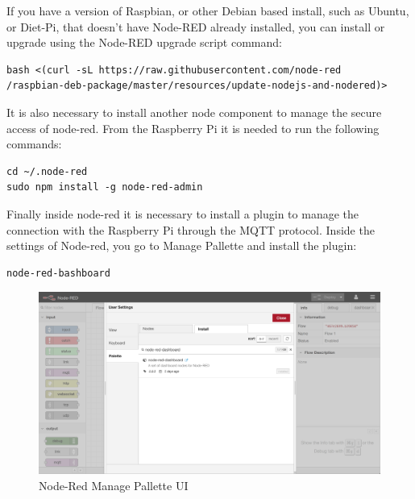 \noindent
If you have a version of Raspbian, or other Debian based install, such as Ubuntu, or Diet-Pi, that doesn't have Node-RED already installed, you can install or upgrade using the Node-RED upgrade script command:

\begin{verbatim}
bash <(curl -sL https://raw.githubusercontent.com/node-red
/raspbian-deb-package/master/resources/update-nodejs-and-nodered)>
\end{verbatim}

\noindent
It is also necessary to install another node component to manage the secure access of node-red.
\newline
\newline
From the Raspberry Pi it is needed to run the following commands:
\begin{verbatim}
cd ~/.node-red
sudo npm install -g node-red-admin
\end{verbatim}

\noindent
Finally inside node-red it is necessary to install a plugin to manage the connection with the Raspberry Pi through the MQTT protocol.
\newline
\newline
Inside the settings of Node-red, you go to Manage Pallette and install the plugin:
\begin{verbatim}
node-red-bashboard
\end{verbatim}
\begin{figure}[H]
	\begin{center}
		\includegraphics[width=1.0\textwidth]{./pictures/node-red-dashboard}
		\caption{Node-Red Manage Pallette UI}
		\label{mqtt_functioning}
	\end{center}
\end{figure}

